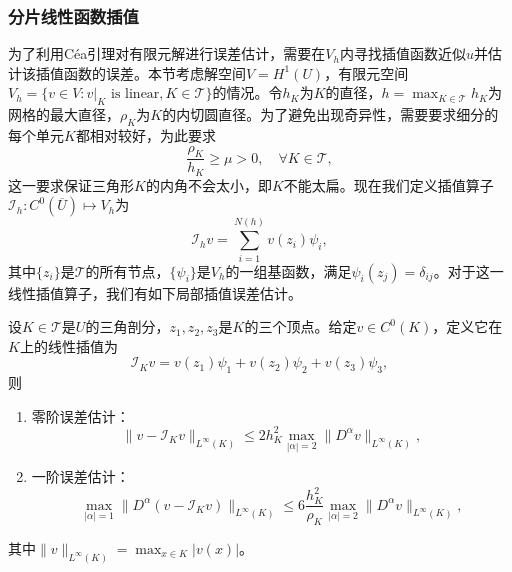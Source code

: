 \documentclass[a4paper,10pt]{ctexart}
\begin{document}
\subsubsection{分片线性函数插值}
为了利用Céa引理对有限元解进行误差估计，需要在$ V_h $内寻找插值函数近似$ u $并估计该插值函数的误差。本节考虑解空间$ V=H^1(U) $，有限元空间$ V_h = \{v\in V:v|_K \text{ is linear}, K\in \mathcal{T}\} $的情况。令$ h_K $为$ K $的直径，$ h = \max_{K\in \mathcal{T}}h_K $为网格的最大直径，$ \rho_K $为$ K $的内切圆直径。为了避免出现奇异性，需要要求细分的每个单元$ K $都相对较好，为此要求
\begin{equation}\label{eq:mesh_condition}
    \frac{\rho_K}{h_K} \geqslant \mu>0,\quad \forall K\in \mathcal{T},
\end{equation}
这一要求保证三角形$ K $的内角不会太小，即$ K $不能太扁。现在我们定义插值算子$ \mathcal{I}_h:C^0(\overline{U})\mapsto V_h $为
\begin{equation}
    \mathcal{I}_h v = \sum_{i=1}^{N(h)} v(z_i)\psi_i,
\end{equation}
其中$ \{z_i\} $是$ \mathcal{T} $的所有节点，$ \{\psi_i\} $是$ V_h $的一组基函数，满足$ \psi_i(z_j) = \delta_{ij} $。对于这一线性插值算子，我们有如下局部插值误差估计。
\begin{theorem}
    设$ K\in \mathcal{T} $是$ U $的三角剖分，$ z_1,z_2,z_3 $是$ K $的三个顶点。给定$ v\in C^0(K) $，定义它在$ K $上的线性插值为
    \begin{equation}
        \mathcal{I}_K v = v(z_1)\psi_1 + v(z_2)\psi_2 + v(z_3)\psi_3,
    \end{equation}
    则
    \begin{enumerate}
        \item 零阶误差估计：
        \begin{equation}
            \| v-\mathcal{I}_K v \|_{L^\infty(K)} \leqslant 2h_K^2\max_{|\alpha|=2}\| D^\alpha v \|_{L^\infty(K)},
        \end{equation}
        \item 一阶误差估计：
        \begin{equation}
            \max_{|\alpha|=1}\| D^\alpha(v-\mathcal{I}_K v) \|_{L^\infty(K)} \leqslant 6\frac{h_K^2}{\rho_K}\max_{|\alpha|=2}\| D^\alpha v \|_{L^\infty(K)},
        \end{equation}
    \end{enumerate}
    其中$ \| v \|_{L^\infty(K)} = \max_{x\in K}|v(x)| $。
\end{theorem}
\end{document}
